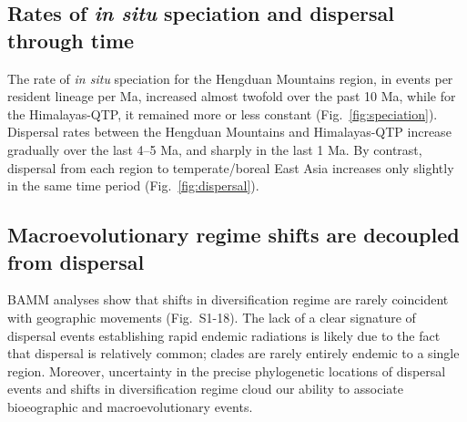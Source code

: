 \subsection{Rates of \textit{in situ} speciation and dispersal through time}

The rate of \textit{in situ} speciation for the Hengduan Mountains region, in events per resident lineage per Ma, increased almost twofold over the past 10 Ma, while for the Himalayas-QTP, it remained more or less constant (Fig.~\ref{fig:speciation}). Dispersal rates between the Hengduan Mountains and Himalayas-QTP increase gradually over the last 4--5 Ma, and sharply in the last 1 Ma. By contrast, dispersal from each region to temperate/boreal East Asia increases only slightly in the same time period (Fig.~\ref{fig:dispersal}).

\subsection{Macroevolutionary regime shifts are decoupled from dispersal}

BAMM analyses show that shifts in diversification regime are rarely coincident with geographic movements (Fig.~S1-18). The lack of a clear signature of dispersal events establishing rapid endemic radiations is likely due to the fact that dispersal is relatively common; clades are rarely entirely endemic to a single region. Moreover, uncertainty in the precise phylogenetic locations of dispersal events and shifts in diversification regime cloud our ability to associate bioeographic and macroevolutionary events.